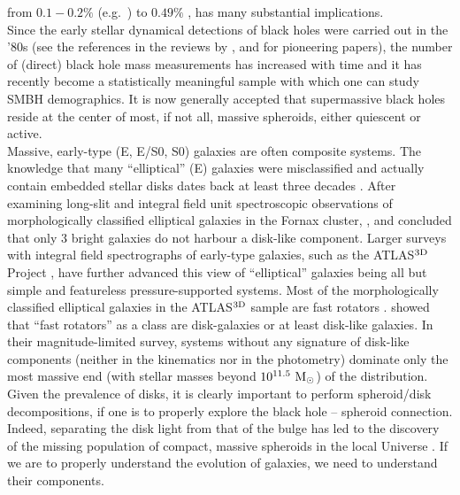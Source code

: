 \documentclass[preprint2]{emulateapj}
\begin{document}
from $0.1 - 0.2\%$ (e.g.~\citealt{marconihunt2003,haringrix2004}) to $0.49\%$ \citep{grahamscott2015}, 
has many substantial implications. \\
Since the early stellar dynamical detections of black holes were carried out in the '80s 
(see the references in the reviews by \citealt{kormendyrichstone1995}, \citealt{richstone1998} 
and \citealt{graham2015bulges} for pioneering papers), 
the number of (direct) black hole mass measurements has increased with time 
and it has recently become a statistically meaningful sample  
with which one can study SMBH demographics. 
It is now generally accepted that supermassive black holes reside at the center of most, if not all, 
massive spheroids, either quiescent or active. \\
Massive, early-type (E, E/S0, S0) galaxies are often composite systems. 
The knowledge that many ``elliptical'' (E) galaxies were misclassified and actually contain embedded stellar disks dates back  
at least three decades  
\citep{capaccioli1987,carter1987,rixwhite1990,rixwhite1992,bender1990,scorzabender1990,nieto1991,scorzabender1995}. 
After examining long-slit and integral field unit spectroscopic observations of morphologically classified elliptical galaxies in the Fornax cluster, 
\cite{donofrio1995}, \cite{graham1998fornax} and \cite{scott2014} concluded that only 3 bright galaxies do not harbour a disk-like component.
Larger surveys with integral field spectrographs of early-type galaxies, such as the ATLAS$^{\rm 3D}$ Project \citep{cappellari2011}, 
have further advanced this view of ``elliptical'' galaxies being all but simple and featureless pressure-supported systems.
Most of the morphologically classified elliptical galaxies in the ATLAS$^{\rm 3D}$ sample are fast rotators \citep{atlas3dIII}.
\cite{krajnovic2013} showed that ``fast rotators'' as a class are disk-galaxies or at least disk-like galaxies. 
In their magnitude-limited survey, systems 
without any signature of disk-like components (neither in the kinematics nor in the photometry) 
dominate only the most massive end (with stellar masses beyond $10^{11.5}~\rm M_\odot$) of the distribution. 
Given the prevalence of disks, it is clearly important to perform spheroid/disk decompositions, 
if one is to properly explore the black hole -- spheroid connection. 
Indeed, separating the disk light from that of the bulge has led to the discovery of the missing population of compact, massive spheroids 
in the local Universe \citep{GDS2015}.
If we are to properly understand the evolution of galaxies, we need to understand their components.\\
\end{document}
